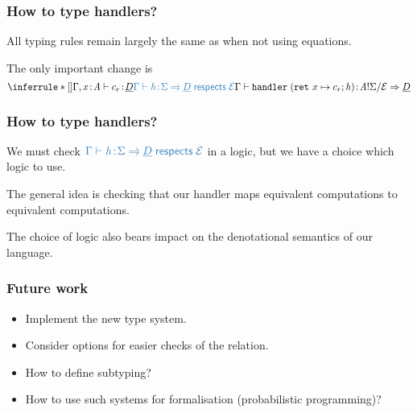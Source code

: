 \documentclass[usenames,dvipsnames]{beamer}
\begin{document}
\begin{frame}
	\frametitle{How to type handlers?}
	All typing rules remain largely the same as when not using equations.

	\vspace{5mm}

	The only important change is
	\[
		\inferrule*[]
		{
			\judgement{\ctx, x \oftype \tyA}{c_r}{\ctyD}
			\\
			\new{\respects{\hcases}{\eqE}{\sig}{\ctyD}}
			\\
		}
		{\judgement{\ctx}
			{\handler{\hcases}}
			{\ctype{\tyA}{\sig}{\eqE} \hto \ctyD}
		}
	\]

\end{frame}
\begin{frame}
	\frametitle{How to type handlers?}
	
	We must check $\new{\respects{\hcases}{\eqE}{\sig}{\ctyD}}$ in a logic, but we have a choice which logic to use.

	\vspace{5mm}

	The general idea is checking that our handler maps equivalent computations to equivalent computations.

	\vspace{5mm}

	The choice of logic also bears impact on the denotational semantics of our language.

\end{frame}
\begin{frame}
	\frametitle{Future work}
	
	\begin{itemize}
		\item Implement the new type system.
		\item Consider options for easier checks of the  relation.
		\item How to define subtyping?
		\item How to use such systems for formalisation (probabilistic programming)?
	\end{itemize}

\end{frame}
\end{document}
